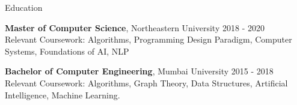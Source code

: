 \documentclass{resume} %
\begin{document}

\begin{rSection}{Education}

{\bf Master of Computer Science}, Northeastern University \hfill {2018 - 2020}\\
Relevant Coursework: Algorithms, Programming Design Paradigm, Computer Systems, Foundations of AI, NLP

{\bf Bachelor of Computer Engineering}, Mumbai University \hfill {2015 - 2018}\\
Relevant Coursework: Algorithms, Graph Theory, Data Structures, Artificial Intelligence, Machine Learning. 


\end{rSection}
\end{document}
